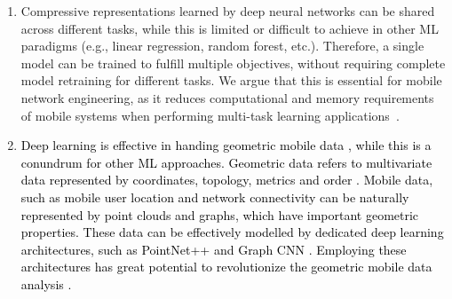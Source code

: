 \documentclass[journal,comsoc,letter]{IEEEtran}
\newcommand{\rev}[1]{\textcolor{black}{#1}}
\begin{document}
\begin{enumerate}
\item Compressive representations learned by deep neural networks can be shared across different tasks, while this is limited or difficult to achieve in other ML paradigms (e.g., linear regression, random forest, etc.). Therefore, a single model can be trained to fulfill multiple objectives, without requiring complete model retraining for different tasks. We argue that this is essential for mobile network engineering, as it reduces computational and memory requirements of mobile systems when performing multi-task learning applications~\cite{georgiev2017low}. 

\item \rev{Deep learning is effective in handing geometric mobile data \cite{monti2017geometric}, while this is a conundrum for other ML approaches. Geometric data refers to multivariate data represented by coordinates, topology, metrics and order \cite{le2004geometric}. Mobile data, such as mobile user location and network connectivity can be naturally represented by point clouds and graphs, which have important geometric properties. These data can be effectively modelled by dedicated deep learning architectures, such as PointNet++ \cite{qi2017pointnet} and Graph CNN \cite{kipf2016semi}. Employing these architectures has great potential to revolutionize the geometric mobile data analysis \cite{wang2018spatio}.}
\end{enumerate}
\end{document}
